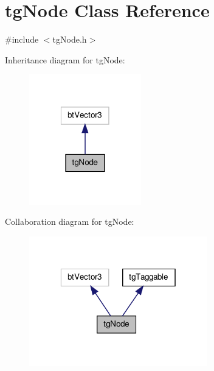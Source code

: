 \hypertarget{classtg_node}{\section{tg\-Node Class Reference}
\label{classtg_node}
}


{\ttfamily \#include $<$tg\-Node.\-h$>$}



Inheritance diagram for tg\-Node\-:\nopagebreak
\begin{figure}[H]
\begin{center}
\leavevmode
\includegraphics[width=138pt]{classtg_node__inherit__graph}
\end{center}
\end{figure}


Collaboration diagram for tg\-Node\-:\nopagebreak
\begin{figure}[H]
\begin{center}
\leavevmode
\includegraphics[width=220pt]{classtg_node__coll__graph}
\end{center}
\end{figure}
